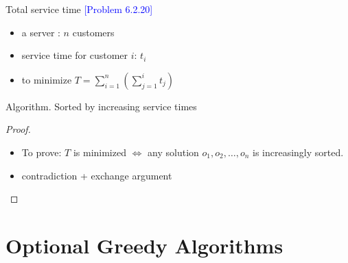 \documentclass{beamer}
\newcommand{\problemno}[1]{\textcolor{blue}{\scriptsize [Problem #1]}}
\begin{document}
\begin{frame}{}
  \begin{block}{Total service time \problemno{6.2.20}}
    \begin{itemize}
      \item a server : $n$ customers
      \item service time for customer $i$: $t_i$
      \item to minimize $T = \sum_{i=1}^{n} (\sum_{j=1}^{i} t_j)$
    \end{itemize}
  \end{block}

  \begin{block}{Algorithm.}
    Sorted by increasing service times
  \end{block}

  \begin{proof}
    \begin{itemize}
      \item To prove: $T$ is minimized $\Leftrightarrow$ any solution $o_1, o_2,
    	\ldots, o_n$ is increasingly sorted.
   	  \item contradiction + exchange argument
    \end{itemize}
  \end{proof}
\end{frame}
\section{Optional Greedy Algorithms}
\end{document}
